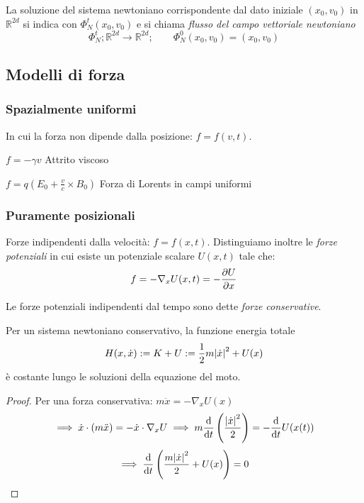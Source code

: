 \begin{definition}
    La soluzione del sistema newtoniano corrispondente dal dato iniziale $(x_0, v_0)$ in $\mathbb{R}^{2d}$ si indica con 
    $\Phi_N^t(x_0,v_0)$ e si chiama \textit{flusso del campo vettoriale newtoniano}
    \begin{equation}
        \Phi_N^t; \mathbb{R}^{2d}\rightarrow\mathbb{R}^{2d} ; \qquad \Phi_N^0 (x_0,v_0)= (x_0,v_0) 
    \end{equation}
\end{definition}





\subsection{Modelli di forza}

\subsubsection{Spazialmente uniformi}
In cui la forza non dipende dalla posizione: $f = f(v,t)$.
\begin{example}
    $f = -\gamma v $ Attrito viscoso
\end{example}
\begin{example}
    $f = q(E_0+ \frac{v}{c}\times B_0)$ Forza di Lorents in campi uniformi
\end{example}



\subsubsection{Puramente posizionali}
Forze indipendenti dalla velocità: $f= f(x,t)$. Distinguiamo inoltre le \textit{forze potenziali} in cui esiste un potenziale scalare $U(x,t)$
tale che:
\begin{equation}
    f= -\nabla_xU(x,t)= -\pdv{U}{x}(x,t)
\end{equation}

Le forze potenziali indipendenti dal tempo sono dette \textit{forze conservative}.
\begin{theorem}
    Per un sistema newtoniano conservativo, la funzione energia totale
    \begin{equation}
        H(x,\dot{x}):= K +U := \frac{1}{2}m\abs{\dot{x}}^2+U(x)
    \end{equation}
    è costante lungo le soluzioni della equazione del moto.
\end{theorem}
\begin{proof}
    Per una forza conservativa: $m\ddot{x}= -\nabla_xU(x)$
    \begin{equation*}
        \implies \dot{x}\cdot (m\ddot{x})= -\dot{x} \cdot\nabla_xU \implies m\dv{}{t}\left( \frac{\abs{\dot{x}}^2}{2} \right)= -\dv{}{t}U(x(t))
    \end{equation*}
    \begin{equation}
        \implies \dv{}{t}\left( \frac{m\abs{\dot{x}}^2}{2} +U(x) \right) = 0
    \end{equation}
\end{proof}

